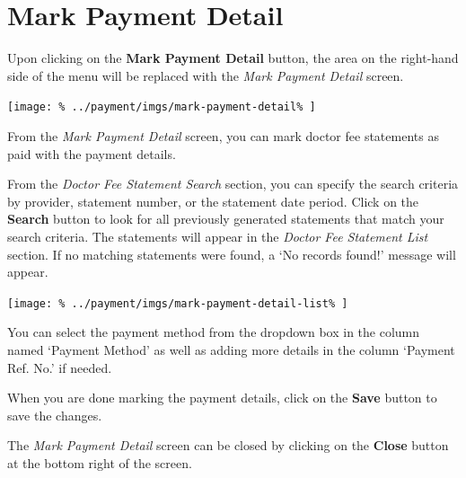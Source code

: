 \documentclass[../main/main]{subfiles}
\begin{document}
\newpage
\section{Mark Payment Detail}
\label{sec:mark-payment-detail}

Upon clicking on the \textbf{Mark Payment Detail} button,
the area on the right-hand side of the menu will be replaced with the
\emph{Mark Payment Detail} screen.

\texttt{[image: \%
  ../payment/imgs/mark-payment-detail\%
]}

From the \emph{Mark Payment Detail} screen, you can mark doctor fee statements
as paid with the payment details.

From the \emph{Doctor Fee Statement Search} section, you can specify the search
criteria by provider, statement number, or the statement date period. Click
on the \textbf{Search} button to look for all previously generated statements
that match your search criteria. The statements will appear in the
\emph{Doctor Fee Statement List} section.
If no matching statements were found, a `No records found!' message will appear.

\texttt{[image: \%
  ../payment/imgs/mark-payment-detail-list\%
]}

\pagebreak

You can select the payment method from the dropdown box in the column named
`Payment Method' as well as adding more details in the column `Payment Ref. No.'
if needed.

When you are done marking the payment details, click on the \textbf{Save}
button to save the changes.

The \emph{Mark Payment Detail} screen can be closed by clicking on
the \textbf{Close} button at the bottom right of the screen.
\end{document}

